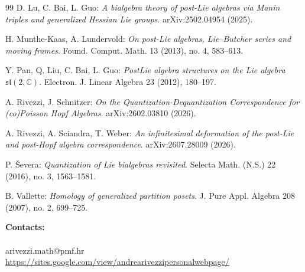 \documentclass[11pt,english]{article}
\theoremstyle{definition}
\begin{document}
\begin{thebibliography}{99}
D. Lu, C. Bai, L. Guo:
\emph{A bialgebra theory of post-Lie algebras via Manin
triples and generalized Hessian Lie groups}.
arXiv:2502.04954 (2025).

H. Munthe-Kaas, A. Lundervold:
\emph{On post-Lie algebras, Lie--Butcher series
and moving frames}.
Found. Comput. Math. 13 (2013), no. 4, 583--613.

Y. Pan, Q. Liu, C. Bai, L. Guo:
\emph{PostLie algebra structures on the Lie algebra
$\mathfrak{sl}(2,\mathbb C)$}.
Electron. J. Linear Algebra 23 (2012), 180--197.

A. Rivezzi, J. Schnitzer:
\emph{On the Quantization-Dequantization
Correspondence for (co)Poisson Hopf Algebras}.
arXiv:2602.03810 (2026).

A. Rivezzi, A. Sciandra, T. Weber:
\emph{An infinitesimal deformation of the post-Lie
and post-Hopf algebra correspondence}.
arXiv:2607.28009 (2026).

P. \v{S}evera:
\emph{Quantization of Lie bialgebras revisited}.
Selecta Math. (N.S.) 22 (2016), no. 3, 1563--1581.

B. Vallette:
\emph{Homology of generalized partition posets}.
J. Pure Appl. Algebra 208 (2007), no. 2, 699--725.

\end{thebibliography}

\textbf{Contacts:}\\
~\\
arivezzi.math@pmf.hr\\
\url{https://sites.google.com/view/andrearivezzipersonalwebpage/}
\end{document}
